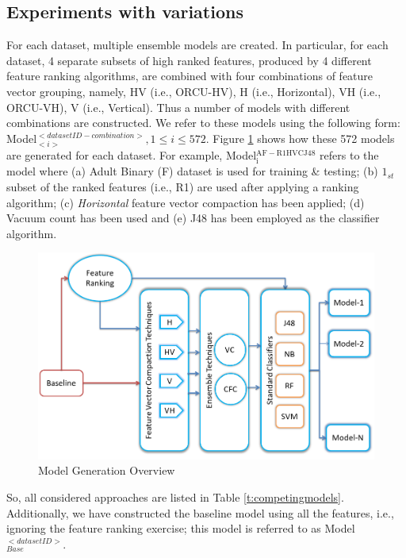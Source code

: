 \subsection{Experiments with variations}
For each dataset, multiple ensemble models are created. In particular, for each dataset, 4 separate subsets of high ranked features, produced by 4 different feature ranking algorithms, are combined with four combinations of feature vector grouping, namely, HV (i.e., ORCU-HV), H (i.e., Horizontal), VH (i.e., ORCU-VH), V (i.e., Vertical). Thus a number of models with different combinations are constructed. We refer to these models using the following form: Model$_{<i>}^{<datasetID-combination>}, 1\leq i \leq 572$. Figure \ref{F:ModelGenOverview} shows how these 572 models are generated for each dataset. For example, Model$_\mathrm{i}^\mathrm{AF-R1HVCJ48}$ refers to the model where (a) Adult Binary (F) dataset is used for training \& testing; (b) $1_{st}$ subset of the ranked features (i.e., R1) are used after applying a ranking algorithm; (c) \textit{Horizontal} feature vector compaction has been applied; (d) Vacuum count has been used and (e) J48 has been employed as the classifier algorithm.

\begin{figure}[h] 
	\centering 
	\includegraphics[scale=0.5]{fig/ModelGenOverview.png}
	\caption{Model Generation Overview}
	\label{F:ModelGenOverview}
\end{figure}

So, all considered approaches are listed in Table \ref{t:competingmodels}. Additionally, we have constructed the baseline model using all the features, i.e., ignoring the feature ranking exercise; this model is referred to as Model$_{Base}^{<datasetID>}$.

